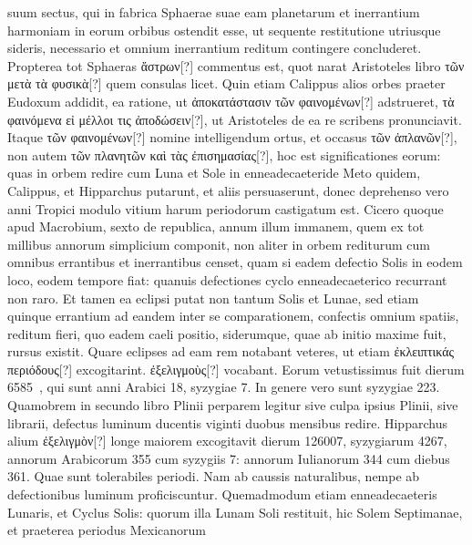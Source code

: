 suum sectus, qui in fabrica Sphaerae suae eam planetarum et inerrantium
harmoniam in eorum orbibus ostendit esse, ut sequente
restitutione utriusque sideris, necessario et omnium inerrantium reditum
contingere concluderet.
Propterea tot Sphaeras \textgreek{ἄστρων[?]} commentus
est, quot narat Aristoteles libro 
 \textgreek{τῶν μετὰ τὰ φυσικὰ[?]} quem
consulas licet.
Quin etiam Calippus alios orbes praeter Eudoxum
addidit, ea ratione, ut \textgreek{ἀποκατάστασιν τῶν φαινομένων[?]} adstrueret,
 \textgreek{τὰ φαινόμενα εἰ μέλλοι τις ἀποδώσειν[?]},
ut Aristoteles de ea re scribens pronunciavit.
Itaque \textgreek{τῶν φαινομένων[?]} nomine intelligendum ortus,
 et occasus \textgreek{τῶν ἀπλανῶν[?]},
non autem \textgreek{τῶν πλανητῶν καὶ τὰς ἐπισημασίας[?]}, hoc est significationes
eorum: quas in orbem redire cum Luna et Sole in enneadecaeteride
Meto quidem, Calippus, et Hipparchus putarunt, et aliis
persuaserunt, donec deprehenso vero anni Tropici modulo vitium
harum periodorum castigatum est.
%
Cicero quoque apud Macrobium,
sexto de republica, annum illum immanem, quem ex tot millibus
annorum simplicium componit, non aliter in orbem rediturum
cum omnibus errantibus et inerrantibus censet, quam si eadem defectio
Solis in eodem loco, eodem tempore fiat: quanuis defectiones
cyclo enneadecaeterico recurrant non raro.
Et tamen ea eclipsi putat
non tantum Solis et Lunae, sed etiam quinque errantium ad eandem
inter se comparationem, confectis omnium spatiis, reditum fieri, quo
eadem caeli positio, siderumque, quae ab initio maxime fuit, rursus existit.
Quare eclipses ad eam rem notabant veteres, ut etiam
 \textgreek{ἐκλειπτικάς
περιόδους[?]} excogitarint.
\textgreek{ἐξελιγμοὺς[?]} vocabant.
Eorum vetustissimus fuit
dierum 6585~, qui sunt anni Arabici 18, syzygiae 7.
In genere vero
sunt syzygiae 223.
Quamobrem in secundo libro Plinii perparem legitur
sive culpa ipsius Plinii, sive librarii, defectus luminum ducentis
viginti duobus mensibus redire.
Hipparchus alium \textgreek{ἐξελιγμὸν[?]} longe
maiorem excogitavit dierum 126007, syzygiarum 4267, annorum
Arabicorum 355 cum syzygiis 7: annorum Iulianorum 344 cum
diebus 361.
Quae sunt tolerabiles periodi.
Nam ab caussis naturalibus,
nempe ab defectionibus luminum proficiscuntur.
Quemadmodum
etiam enneadecaeteris Lunaris, et Cyclus Solis: quorum illa Lunam
Soli restituit, hic Solem Septimanae, et praeterea periodus Mexicanorum
